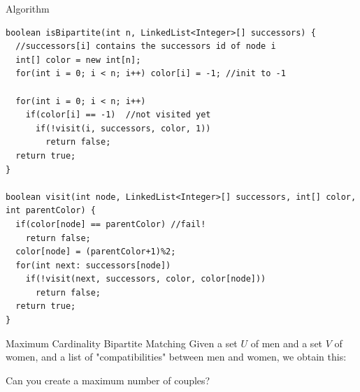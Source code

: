 \documentclass[12pt]{beamer}
\begin{document}
\begin{frame}[fragile]{Algorithm}
  \begin{lstlisting}
boolean isBipartite(int n, LinkedList<Integer>[] successors) {
  //successors[i] contains the successors id of node i
  int[] color = new int[n];
  for(int i = 0; i < n; i++) color[i] = -1; //init to -1
  
  for(int i = 0; i < n; i++)
    if(color[i] == -1)  //not visited yet
      if(!visit(i, successors, color, 1))
        return false;
  return true;
}

boolean visit(int node, LinkedList<Integer>[] successors, int[] color, int parentColor) {
  if(color[node] == parentColor) //fail!
    return false;
  color[node] = (parentColor+1)%2;
  for(int next: successors[node])
    if(!visit(next, successors, color, color[node]))
      return false;
  return true;
}
  \end{lstlisting}
\end{frame}

\begin{frame}{Maximum Cardinality Bipartite Matching}
    Given a set $U$ of men and a set $V$ of women, and a list of "compatibilities" between men and women, we obtain this:
    \centering
    
    Can you create a maximum number of couples?
\end{frame}
\end{document}
